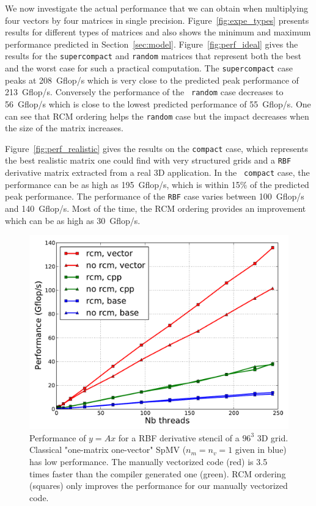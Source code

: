 \documentclass{sig-alternate}
\begin{document}
We now investigate the actual performance that we can obtain when
multiplying four vectors by four matrices in single
precision. Figure~\ref{fig:expe_types} presents results for different
types of matrices and also shows the minimum and maximum performance
predicted in Section~\ref{sec:model}. Figure~\ref{fig:perf_ideal}
gives the results for the {\tt supercompact} and {\tt random} matrices
that represent both the best and the worst case for such a practical 
computation. The {\tt supercompact} case peaks at
208~Gflop/s which is very close to the predicted peak
performance of 213~Gflop/s. Conversely the performance of the {\tt
  random} case decreases to 56~Gflop/s which is close to
the lowest predicted performance of 55~Gflop/s. One can see that RCM
ordering helps the {\tt random} case but the impact decreases when the
size of the matrix increases.

Figure~\ref{fig:perf_realistic} gives the results on the {\tt compact}
case, which represents the best realistic matrix one could find with very
structured grids and a
{\tt RBF} derivative matrix extracted from a real 3D application. In the {\tt
  compact} case, the performance can be as high as 195~Gflop/s, which is
within 15\% of the predicted  peak performance. The performance of the
{\tt RBF} case varies between 100~Gflop/s and 140~Gflop/s. Most of the
time, the RCM ordering provides an improvement which can be as high as
30~Gflop/s.

\begin{figure}[t]
  \centering 
  
  \includegraphics[width=.9\linewidth]{figures/mic_performance_nb_threads.pdf}

  \caption{Performance of $y=Ax$ for a RBF derivative stencil of a
    $96^3$ 3D grid. Classical "one-matrix one-vector" SpMV ($n_m=n_v=1$ given in blue) has low
    performance. The manually vectorized code (red) is 3.5 times
    faster than the compiler generated one (green). RCM ordering
    (squares) only improves the performance for our manually
    vectorized code.}
  \label{fig:comparison_spmv}
  \label{fig:perf_mic}
\end{figure}
\end{document}
